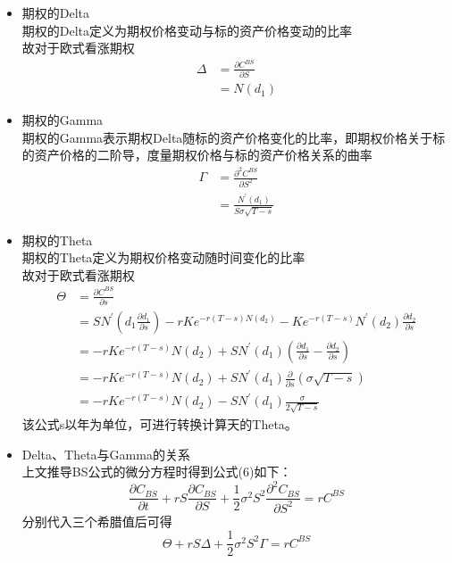\documentclass{article}
\begin{document}
\begin{itemize}
	\item 期权的Delta\\
	期权的Delta定义为期权价格变动与标的资产价格变动的比率\\
	故对于欧式看涨期权\\
	\begin{align}
	\nonumber \Delta & = \frac{\partial C^{BS}}{\partial S}\\
	\nonumber  & = N(d_{1}) 
	\end{align}
	\item 期权的Gamma\\
	期权的Gamma表示期权Delta随标的资产价格变化的比率，即期权价格关于标的资产价格的二阶导，度量期权价格与标的资产价格关系的曲率\\
	\begin{align}
	\nonumber \Gamma & = \frac{\partial^2 C^{BS}}{\partial S^2}\\
	\nonumber  & = \frac{N^{'}(d_{1})}{S\sigma\sqrt{T-s}} 
	\end{align}
	\item  期权的Theta\\
	期权的Theta定义为期权价格变动随时间变化的比率\\
	故对于欧式看涨期权\\
	\begin{align}
	\nonumber \Theta & = \frac{\partial C^{BS}}{\partial s}\\
	\nonumber  & = SN^{'}(d_{1}\frac{\partial d_{1}}{\partial s}) -
	rKe^{-r(T-s)N(d_{2})}-Ke^{-r(T-s)}N^{'}(d_{2})\frac{\partial d_{2}}{\partial s}\\
	\nonumber  & =-rKe^{-r(T-s)}N(d_{2}) + SN^{'}(d_{1})(\frac{\partial d_{1}}{\partial s}-\frac{\partial d_{2}}{\partial s})\\
	\nonumber  & = -rKe^{-r(T-s)}N(d_{2}) + SN^{'}(d_{1})\frac{\partial }{\partial s}(\sigma\sqrt{T-s})\\
	\nonumber  & = -rKe^{-r(T-s)}N(d_{2}) - SN^{'}(d_{1})\frac{\sigma}{2\sqrt{T-s}}
	\end{align} 
	该公式s以年为单位，可进行转换计算天的Theta。
	\item Delta、Theta与Gamma的关系\\
	上文推导BS公式的微分方程时得到公式(6)如下：\\
	\[\frac{\partial C_{BS}}{\partial t} + r S \frac{\partial C_{BS}}{\partial S}
	+ \frac{1}{2} \sigma^2 S^2 \frac{\partial^2 C_{BS}}{\partial S^2} 
	= r C^{BS}\]
	分别代入三个希腊值后可得\\
	\[\Theta + rS \Delta + \frac{1}{2}\sigma^2S^2\Gamma = r C^{BS}\]

\end{itemize}
\end{document}

